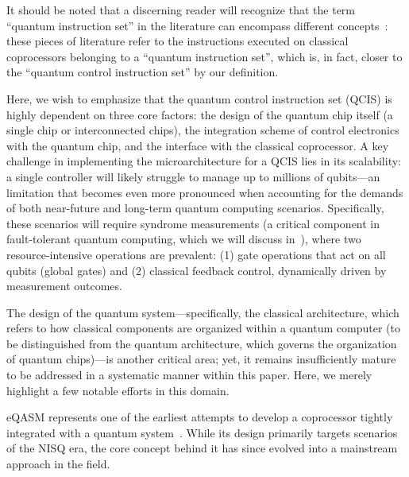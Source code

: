 \documentclass[a4paper,onecolumn,11pt,unpublished]{quantumarticle}
\begin{document}
It should be noted that a discerning reader will recognize that the term ``quantum instruction set'' in the literature can encompass different concepts~\cite{fuExperimentalMicroarchitectureSuperconducting2017,fuEQASMExecutableQuantum2019a,zhouHiMAHierarchicalQuantum2024,zhangClassicalArchitectureDigital2024,zettles262DesignConsiderations2022}: these pieces of literature refer to the instructions executed on classical coprocessors belonging to a ``quantum instruction set'', which is, in fact, closer to the ``quantum control instruction set'' by our definition.

Here, we wish to emphasize that the quantum control instruction set (QCIS) is highly dependent on three core factors: the design of the quantum chip itself (a single chip or interconnected chips), the integration scheme of control electronics with the quantum chip, and the interface with the classical coprocessor. A key challenge in implementing the microarchitecture for a QCIS lies in its scalability: a single controller will likely struggle to manage up to millions of qubits---an limitation that becomes even more pronounced when accounting for the demands of both near-future and long-term quantum computing scenarios. Specifically, these scenarios will require syndrome measurements (a critical component in fault-tolerant quantum computing, which we will discuss in~), where two resource-intensive operations are prevalent: (1) gate operations that act on all qubits (global gates) and (2) classical feedback control, dynamically driven by measurement outcomes.

The design of the quantum system---specifically, the classical architecture, which refers to how classical components are organized within a quantum computer (to be distinguished from the quantum architecture, which governs the organization of quantum chips)---is another critical area; yet, it remains insufficiently mature to be addressed in a systematic manner within this paper. Here, we merely highlight a few notable efforts in this domain.

eQASM represents one of the earliest attempts to develop a coprocessor tightly integrated with a quantum system~\cite{fuExperimentalMicroarchitectureSuperconducting2017, fuEQASMExecutableQuantum2019a}. While its design primarily targets scenarios of the NISQ era, the core concept behind it has since evolved into a mainstream approach in the field.
\end{document}
